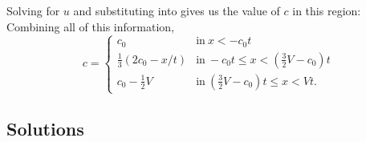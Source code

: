 \documentclass[12pt]{book}
\begin{document}
{Solving  for $u$ and substituting into  gives us the value of $c$ in this region:
Combining all of this information,
 \begin{displaymath}
   c = \left\{
     \begin{array}{ll}
       c_0 & \mathrm{in}\  x<-c_0 t \\
       \frac{1}{3}\left(2c_0 - x/t\right) & \mathrm{in}\  -c_0t \le x < \left(\frac{3}{2}V-c_0\right)t \\
       c_0 - \frac{1}{2}V & \mathrm{in}\  \left(\frac{3}{2}V-c_0\right)t \le x <Vt.
     \end{array}
   \right.
\end{displaymath} 

}




\stopAssignment

\begin{appendices}
\chapter{Solutions}
\setcounter{secnumdepth}{0}



\end{appendices}

\clearpage
\end{document}
